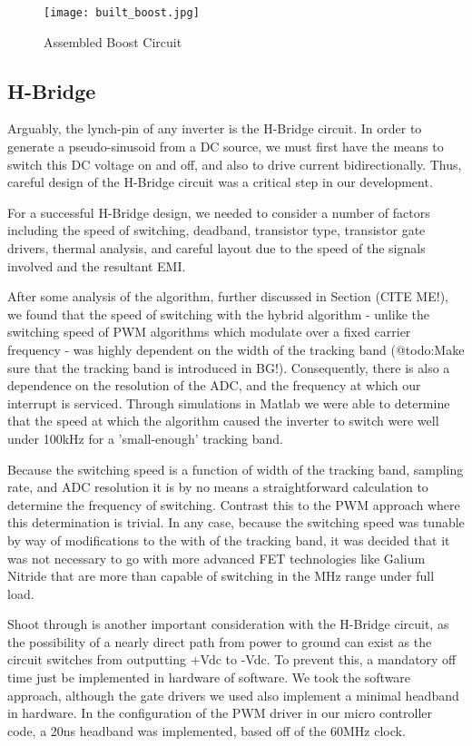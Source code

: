 \begin{figure}
\centering
\texttt{[image: built\_boost.jpg]}
\caption{Assembled Boost Circuit}
\label{Built Boost}
\end{figure}

\subsection{H-Bridge}
Arguably, the lynch-pin of any inverter is the H-Bridge circuit. In order to generate a pseudo-sinusoid from a DC source, we must first have the means to switch this DC voltage on and off, and also to drive current bidirectionally. Thus, careful design of the H-Bridge circuit was a critical step in our development.

For a successful H-Bridge design, we needed to consider a number of factors including the speed of switching, deadband, transistor type, transistor gate drivers, thermal analysis, and careful layout due to the speed of the signals involved and the resultant EMI.

After some analysis of the algorithm, further discussed in Section (CITE ME!), we found that the speed of switching with the hybrid algorithm - unlike the switching speed of PWM algorithms which modulate over a fixed carrier frequency - was highly dependent on the width of the tracking band (@todo:Make sure that the tracking band is introduced in BG!). Consequently, there is also a dependence on the resolution of the ADC, and the frequency at which our interrupt is serviced. Through simulations in Matlab we were able to determine that the speed at which the algorithm caused the inverter to switch were well under 100kHz for a 'small-enough' tracking band. 

Because the switching speed is a function of width of the tracking band, sampling rate, and ADC resolution it is by no means a straightforward calculation to determine the frequency of switching. Contrast this to the PWM approach where this determination is trivial. In any case, because the switching speed was tunable by way of modifications to the with of the tracking band, it was decided that it was not necessary to go with more advanced FET technologies like Galium Nitride that are more than capable of switching in the MHz range under full load. 

Shoot through is another important consideration with the H-Bridge circuit, as the possibility of a nearly direct path from power to ground can exist as the circuit switches from outputting +Vdc to -Vdc. To prevent this, a mandatory off time just be implemented in hardware of software. We took the software approach, although the gate drivers we used also implement a minimal headband in hardware. In the configuration of the PWM driver in our micro controller code, a 20ns headband was implemented, based off of the 60MHz clock.

